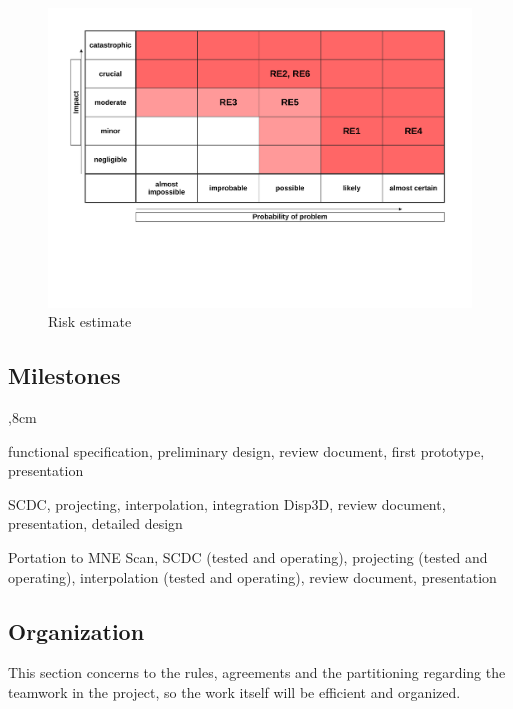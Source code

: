 \begin{figure}[h]
	\begin{center}
		\includegraphics[width= 15cm]{figures/Risikoabschaetzung.pdf}
		\caption{Risk estimate}
	\end{center}
\end{figure}

\clearpage

\subsection{Milestones}
\begin{description}
	,8cm
	\item[First Phase Milestones:] functional specification, preliminary design, review document, first prototype, presentation 
	
	\item[Second Phase Milestone:] SCDC, projecting, interpolation, integration Disp3D, review document, presentation, detailed design
	
	\item[Third Phase Milenstone:] Portation to MNE Scan, SCDC (tested and operating), projecting (tested and operating), interpolation (tested and operating), review document, presentation
\end{description}



\subsection{Organization}

This section concerns to the rules, agreements and the partitioning regarding the teamwork in the project, so the work itself will be efficient and organized. 

